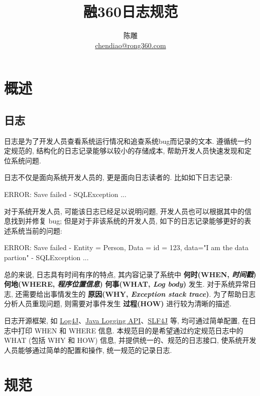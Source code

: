 \documentclass[UTF8,fntef]{ctexart}
\title {融360日志规范}
\author{陈雕\\
	\href{mailto:chendiao@rong360.com}{chendiao@rong360.com} }
\begin{document}
   \maketitle
	
\section{概述}
	\subsection{日志}
	日志是为了开发人员查看系统运行情况和追查系统bug而记录的文本. 遵循统一约定规范的, 结构化的日志记录能够以较小的存储成本, 帮助开发人员快速发现和定位系统问题.
	
	日志不仅是面向系统开发人员的, 更是面向日志读者的. 比如如下日志记录:
	
	\begin{spverbatim}
	ERROR: Save failed - SQLException ...
	\end{spverbatim}
	
	对于系统开发人员, 可能该日志已经足以说明问题, 开发人员也可以根据其中的信息找到并修复 bug; 但是对于非该系统的开发人员, 如下的日志记录能够更好的表述系统当前的问题:
	
	\begin{spverbatim}
	ERROR: Save failed - Entity = Person, Data = {id = 123, data="I am the data partion" } - SQLException ...
	\end{spverbatim}
	
	总的来说, 日志具有时间有序的特点, 其内容记录了系统中 \textbf{何时(WHEN, \textit{时间戳})} \textbf{何地(WHERE, \textit{程序位置信息})}  \textbf{何事(WHAT, \textit{Log body})} 发生. 对于系统异常日志, 还需要给出事情发生的 \textbf{原因(WHY, \textit{ Exception stack trace})}. 为了帮助日志分析人员重现问题, 则需要对事件发生 \textbf{过程(HOW)} 进行较为清晰的描述.
	
	日志开源框架, 如 \href{http://logging.apache.org/log4j/}{Log4J}、\href{http://docs.oracle.com/javase/8/docs/technotes/guides/logging/}{Java Logging API}、\href{http://www.slf4j.org/}{SLF4J} 等, 均可通过简单配置, 在日志中打印 WHEN 和 WHERE 信息. 本规范目的是希望通过约定规范日志中的 WHAT (包括 WHY 和 HOW) 信息, 并提供统一的、规范的日志接口, 使系统开发人员能够通过简单的配置和操作, 统一规范的记录日志.



\section{规范}
\end{document}
